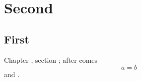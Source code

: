 \documentclass{report}
\begin{document}
\setcounter{chapter}{1}
\chapter{Second}
\section{First}
Chapter \thechapter, section \thesection; \setcounter{equation}{3}after \theequation{} comes
\begin{equation}
a = b
\end{equation}
and \thesubsection.
\end{document}
